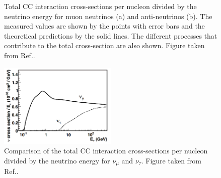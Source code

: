 \begin{figure} %
    \centering
    \quad
    \caption[The caption]
    {Total CC interaction cross-sections per nucleon divided by the neutrino energy for muon
        neutrinos (a) and anti-neutrinos (b). The measured values are shown by the points with
        error bars and the theoretical predictions by the solid lines. The different processes
        that contribute to the total cross-section are also shown. Figure taken from
        Ref.\cite{formaggio2012}.}
    \label{fig:cross_sections}
\end{figure}

\begin{figure} %
    \includegraphics[origin=c,width=0.5\textwidth]{diagrams/3-theory/tau_comparison.png}
    \caption[tau comparison short]
    {Comparison of the total CC interaction cross-sections per nucleon divided by the neutrino
        energy for $\nu_{\mu}$ and $\nu_{\tau}$. Figure taken from Ref.\cite{formaggio2012}.}
    \label{fig:tau_comparison}
\end{figure}

